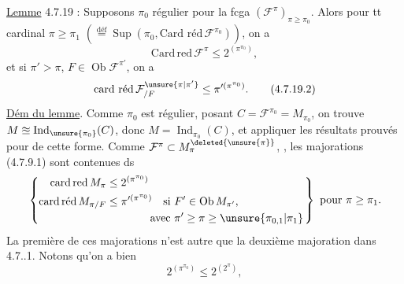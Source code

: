 \uline{Lemme} 4.7.19 : Supposons $\pi_0$ régulier pour la
fcga $(\mathcal F^\pi)_{\pi\geq\pi_0}$. Alors pour tt cardinal $\pi\geq\pi_1$
$(\overset{\text{déf}}{=}\operatorname{Sup}(\pi_0,\text{Card réd}\,\mathcal F^{\pi_0}))$, on a
\[
\mathrm{Card\,red}\,\mathcal F^\pi\leq2^{(\pi^{\pi_0})},
\tag*{(4.7.19.1)}
\]
et si $\pi'>\pi$,  $F\in\operatorname{Ob}\mathcal F^{\pi'}$, on a
\[
\text{card réd}\,\mathcal F^{\unsure{\pi|\pi'}}_{/F}\leq\pi'^{(\pi^{\pi_0})}.
\tag*{(4.7.19.2)}
\]
\uline{Dém du lemme}. Comme $\pi_0$ est régulier,
posant $C=\mathcal F^{\pi_0}=M_{\pi_0}$, on trouve $M\approxeq\operatorname{Ind}_{\unsure{\pi_0}}(C)$,
donc  $M=\operatorname{Ind}_{\pi_0}(C)$, et appliquer les
résultats prouvés pour  de cette
forme. Comme $\mathcal F^\pi\subset M^{\deleted{\unsure{\pi}}}_{\pi}$, , les majorations
(4.7.9.1)  sont contenues ds
\[
\left.\left\{\begin{aligned}
\operatorname{card\,red}M_\pi &\leq 2^{(\pi^{\pi_0})}\\
\operatorname{card\,\text{réd}}M_{\pi/F} &\leq \pi'^{(\pi^{\pi_0})}
\quad\text{si }F'\in\operatorname{Ob}M_{\pi'},\\
&\hspace{4em}\text{avec }\pi'\geq\pi\geq\unsure{\pi_{0,1}|\pi_1}
\end{aligned}\right.\right\}\ \text{pour }\pi\geq\pi_1 .
\]
La première de ces majorations n'est autre que
la deuxième majoration dans
4.7..1. Notons qu'on a bien
\[
2^{(\pi^{\pi_0})}\leq2^{(2^\pi)},
\]
